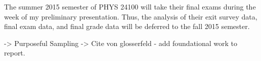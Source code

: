 The summer 2015 semester of PHYS 24100 will take their final exams during the week of my preliminary presentation. Thus, the analysis of their exit survey data, final exam data, and final grade data will be deferred to the fall 2015 semester.


-> Purposeful Sampling
-> Cite von glosserfeld - add foundational work to report.
